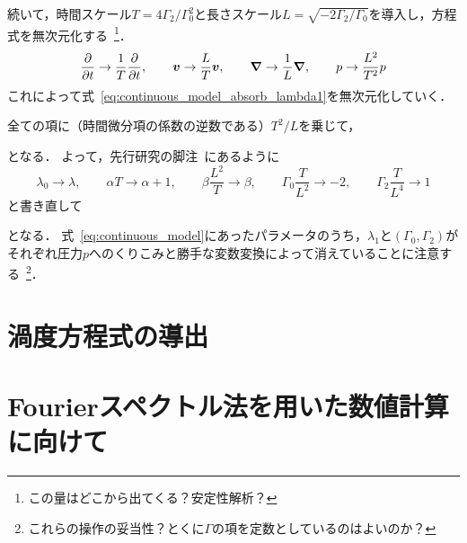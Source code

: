 \documentclass[12pt,dvipdfmx,svgnames,a4paper,uplatex]{ujarticle}
\theoremstyle{plain}
\begin{document}
続いて，時間スケール\(T = 4\Gamma_2/\Gamma_0^2\)と長さスケール\(L = \sqrt{-2\Gamma_2/\Gamma_0}\)を導入し，方程式を無次元化する~\footnote{この量はどこから出てくる？安定性解析？}．
\begin{equation}
  \pdv{t} \to \frac{1}{T} \pdv{t}, \qquad \vb*{v} \to \frac{L}{T} \vb*{v}, \qquad \grad \to \frac{1}{L} \grad, \qquad p \to \frac{L^2}{T^2} p
  \label{eq:nondimensionalization_list}
\end{equation}
これによって式~\ref{eq:continuous_model_absorb_lambda1}を無次元化していく．
全ての項に（時間微分項の係数の逆数である）\(T^2/L\)を乗じて，
となる．
よって，先行研究の脚注~\cite[脚注28]{James}にあるように
\begin{equation}
  \lambda_0 \to \lambda, \qquad \alpha T \to \alpha + 1, \qquad \beta \frac{L^2}{T} \to \beta, \qquad \Gamma_0 \frac{T}{L^2} \to -2, \qquad \Gamma_2 \frac{T}{L^4} \to 1
  \label{eq:redefine_parameters}
\end{equation}
と書き直して
となる．
式~\ref{eq:continuous_model}にあったパラメータのうち，\(\lambda_1\)と\((\Gamma_0, \Gamma_2)\)がそれぞれ圧力\(p\)へのくりこみと勝手な変数変換によって消えていることに注意する~\footnote{これらの操作の妥当性？とくに\(\Gamma\)の項を定数としているのはよいのか？}．


\section{渦度方程式の導出}


\section{Fourierスペクトル法を用いた数値計算に向けて}


\printbibliography[title=参考文献]
\end{document}
